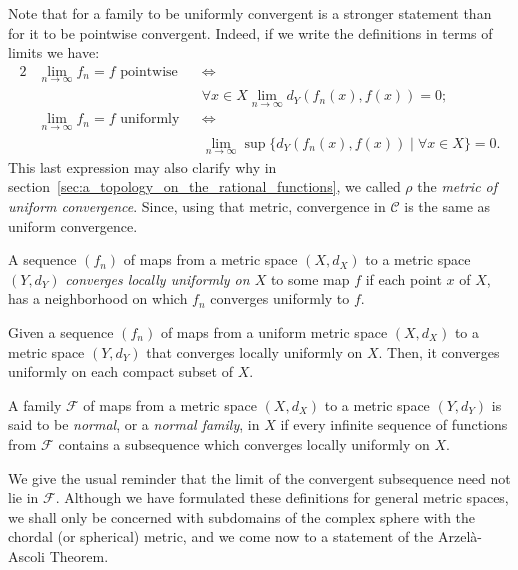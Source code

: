\begin{remark}
    Note that for a family to be uniformly convergent is a stronger statement
    than for it to be pointwise convergent. Indeed, if we write the definitions
    in terms of limits we have:
    \begin{alignat*}{2}
        &\lim_{n \to \infty} f_n = f \text{ pointwise} &&\iff \\
        &&&\forall x \in X \lim_{n \to \infty} d_Y(f_n(x), f(x)) = 0; \\
        &\lim_{n \to \infty} f_n = f \text{ uniformly} &&\iff \\
        &&&\lim_{n \to \infty} \sup\{d_Y(f_n(x), f(x)) \mid \forall x \in X\} =
        0.
    \end{alignat*}
    This last expression may also clarify why in
    section~\ref{sec:a_topology_on_the_rational_functions}, we called $\rho$ the
    \emph{metric of uniform convergence}. Since, using that metric, convergence
    in $\mathcal{C}$ is the same as uniform convergence.
\end{remark}

\begin{definition}
    A sequence $(f_n)$ of maps from a metric space $(X, d_X)$ to a metric space
    $(Y, d_Y)$ \emph{converges locally uniformly on $X$} to some map $f$ if each
    point $x$ of $X$, has a neighborhood on which $f_n$ converges uniformly to
    $f$.
\end{definition}

\begin{remark}
    Given a sequence $(f_n)$ of maps from a uniform metric space $(X, d_X)$ to a
    metric space $(Y, d_Y)$ that converges locally uniformly on $X$. Then, it
    converges uniformly on each compact subset of $X$.
\end{remark}

\begin{definition}
    A family $\mathcal{F}$ of maps from a metric space $(X, d_X)$ to a metric
    space $(Y, d_Y)$ is said to be \emph{normal}, or a \emph{normal family}, in
    $X$ if every infinite sequence of functions from $\mathcal{F}$ contains a
    subsequence which converges locally uniformly on $X$.
\end{definition}

We give the usual reminder that the limit of the convergent subsequence need not
lie in $\mathcal{F}$. Although we have formulated these definitions for general
metric spaces, we shall only be concerned with subdomains of the complex sphere
with the chordal (or spherical) metric, and we come now to a statement of the
Arzelà-Ascoli Theorem.


